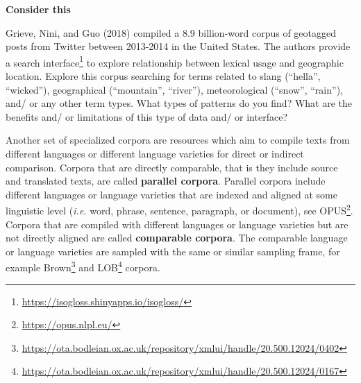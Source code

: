 \documentclass[
  letterpaper,
]{latex/krantz}
\DeclareRobustCommand{\href}[2]{#2\footnote{\url{#1}}}
\begin{document}
\begin{tcolorbox}[enhanced jigsaw, arc=.35mm, leftrule=.75mm, rightrule=.15mm, opacityback=0, colback=white, breakable, bottomrule=.15mm, left=2mm, toprule=.15mm]

\textbf{ Consider this}

Grieve, Nini, and Guo (2018) compiled a 8.9 billion-word corpus of
geotagged posts from Twitter between 2013-2014 in the United States. The
authors provide a \href{https://isogloss.shinyapps.io/isogloss/}{search
interface} to explore relationship between lexical usage and geographic
location. Explore this corpus searching for terms related to slang
(``hella'', ``wicked''), geographical (``mountain'', ``river''),
meteorological (``snow'', ``rain''), and/ or any other term types. What
types of patterns do you find? What are the benefits and/ or limitations
of this type of data and/ or interface?


\end{tcolorbox}

Another set of specialized corpora are resources which aim to compile
texts from different languages or different language varieties for
direct or indirect comparison. Corpora that are directly comparable,
that is they include source and translated texts, are called
\textbf{parallel corpora}. Parallel corpora include different languages
or language varieties that are indexed and aligned at some linguistic
level (\emph{i.e.} word, phrase, sentence, paragraph, or document), see
\href{https://opus.nlpl.eu/}{OPUS}. Corpora that are compiled with
different languages or language varieties but are not directly aligned
are called \textbf{comparable corpora}. The comparable language or
language varieties are sampled with the same or similar sampling frame,
for example
\href{https://ota.bodleian.ox.ac.uk/repository/xmlui/handle/20.500.12024/0402}{Brown}
and
\href{https://ota.bodleian.ox.ac.uk/repository/xmlui/handle/20.500.12024/0167}{LOB}
corpora.
\end{document}
